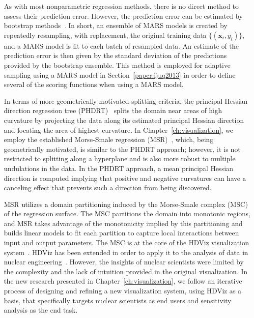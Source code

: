 As with most nonparametric regression methods, there is no direct method to assess their prediction error.
%
However, the prediction error can be estimated by bootstrap methods~\cite{DavisonHinkley1997}.
%
In short, an ensemble of MARS models is created by repeatedly resampling, with replacement, the original training data $\{ (\mathbf{x}_i, y_i) \}$, and a MARS model is fit to each batch of resampled data.
%
An estimate of the prediction error is then given by the standard deviation of the predictions provided by the bootstrap ensemble.
%
This method is employed for adaptive sampling using a MARS model in Section~\ref{paper:ijuq2013} in order to define several of the scoring functions when using a MARS model.

In terms of more geometrically motivated splitting criteria, the principal Hessian direction regression tree (PHDRT)~\cite{LiLueChen2000} splits the domain near areas of high curvature by projecting the data along its estimated principal Hessian direction and locating the area of highest curvature.
%
In Chapter~\ref{ch:visualization}, we employ the established Morse-Smale regression (MSR)~\cite{GerberRubelBremer2011}, which, being geometrically motivated, is similar to the PHDRT approach; however, it is not restricted to splitting along a hyperplane and is also more robust to multiple undulations in the data.
%
In the PHDRT approach, a mean principal Hessian direction is computed implying that positive and negative curvatures can have a canceling effect that prevents such a direction from being discovered.

MSR utilizes a domain partitioning induced by the Morse-Smale complex (MSC) of the regression surface.
%
The MSC partitions the domain into monotonic regions, and MSR takes advantage of the monotonicity implied by this partitioning and builds linear models to fit each partition to capture local interactions between input and output parameters.
%
The MSC is at the core of the HDViz visualization system~\cite{GerberBremerPascucci2010}.
%
HDViz has been extended in order to apply it to the analysis of data in nuclear engineering~\cite{MaljovecLiuWang2015,MaljovecWangMandelli2013a,MaljovecWangPascucci2013}.
%
However, the insights of nuclear scientists were limited by the complexity and the lack of intuition provided in the original visualization.
%
In the new research presented in Chapter~\ref{ch:visualization}, we follow an iterative process of designing and refining a new visualization system, using HDViz as a basis, that specifically targets nuclear scientists as end users and sensitivity analysis as the end task.
%

